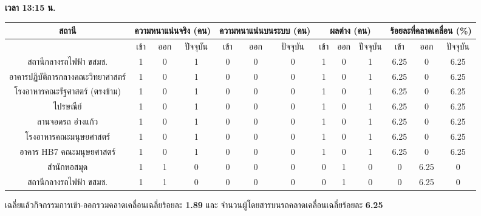     \textbf{เวลา 13:15 น.}
    {\tiny\begin{center}
        \begin{tabular}{ | c | c | c | c | c | c | c | c | c | c | c | c | c |  }
            \hline
                \multirow{2}{*}{สถานี} & \multicolumn{3}{|c|}{ความหนาแน่นจริง (คน)} & \multicolumn{3}{|c|}{ความหนาแน่นบนระบบ (คน)} & \multicolumn{3}{|c|}{ผลต่าง (คน)} & \multicolumn{3}{|c|}{ร้อยละที่คลาดเคลื่อน (\%)} \\
            \hline
                & เข้า & ออก & ปัจจุบัน & เข้า & ออก & ปัจจุบัน & เข้า & ออก & ปัจจุบัน & เข้า & ออก & ปัจจุบัน \\
            \hline
                สถานีกลางรถไฟฟ้า ขสมช.            & 1 & 0 & 1 & 0 & 0 & 0 & 1 & 0 & 1 & 6.25 & 0 & 6.25 \\
                อาคารปฏิบัติการกลางคณะวิทยาศาสตร์    & 1 & 0 & 1 & 0 & 0 & 0 & 1 & 0 & 1 & 6.25 & 0 & 6.25 \\
                โรงอาหารคณะรัฐศาสตร์ (ตรงข้าม)      & 1 & 0 & 1 & 0 & 0 & 0 & 1 & 0 & 1 & 6.25 & 0 & 6.25 \\
                ไปรษณีย์                          & 1 & 0 & 1 & 0 & 0 & 0 & 1 & 0 & 1 & 6.25 & 0 & 6.25 \\
                ลานจอดรถ อ่างแก้ว                  & 1 & 0 & 1 & 0 & 0 & 0 & 1 & 0 & 1 & 6.25 & 0 & 6.25 \\
                โรงอาหารคณะมนุษยศาสตร์            & 1 & 0 & 1 & 0 & 0 & 0 & 1 & 0 & 1 & 6.25 & 0 & 6.25 \\
                อาคาร HB7 คณะมนุษยศาสตร์          & 1 & 0 & 1 & 0 & 0 & 0 & 1 & 0 & 1 & 6.25 & 0 & 6.25 \\
                สำนักหอสมุด                       & 1 & 1 & 0 & 0 & 0 & 0 & 0 & 1 & 0 & 0 & 6.25 & 0 \\
                สถานีกลางรถไฟฟ้า ขสมช.            & 1 & 1 & 0 & 0 & 0 & 0 & 0 & 1 & 0 & 0 & 6.25 & 0 \\
            \hline
        \end{tabular}
    \end{center}}

    เฉลี่ยแล้วกิจกรรมการเข้า-ออกรวมคลาดเคลื่อนเฉลี่ยร้อยละ \textbf{1.89} และ จำนวนผู้โดยสารบนรถคลาดเคลื่อนเฉลี่ยร้อยละ \textbf{6.25}

